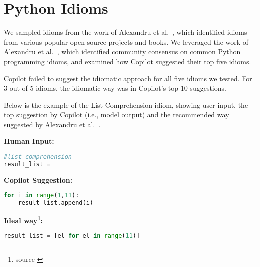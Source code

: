 \section{Python Idioms}
\label{secidioms}
We sampled idioms from the work of Alexandru et al.~\cite{Alexandru2018}, which identified idioms from various popular open source projects and books.
We leveraged the work of Alexandru et al.~\cite{Alexandru2018}, which identified community consensus on common Python programming idioms, and examined how Copilot suggested their top five idioms.

Copilot failed to suggest the idiomatic approach for all five idioms we tested. 
For 3 out of 5 idioms, the idiomatic way was in Copilot's top 10 suggestions.

Below is the example of the List Comprehension idiom, showing user input, the top suggestion by Copilot (i.e., model output) and the recommended way suggested by Alexandru et al.~\cite{Alexandru2018}.

\begin{tcolorbox}[title=List Comprehension,boxsep=.5mm]
\textbf{Human Input:}
\begin{lstlisting}[language={Python}]
#list comprehension
result_list = 
\end{lstlisting}
\tcbline
\textbf{Copilot Suggestion:}
\begin{lstlisting}[language=Python,escapechar=\%]
% \noindent\textcolor{gray}{result\_list  =} % []
for i in range(1,11):
    result_list.append(i)
\end{lstlisting}
\tcbline
\textbf{Ideal way\footnote{source \cite{Alexandru2018}}:}
\begin{lstlisting}[language=Python]
result_list = [el for el in range(11)]
\end{lstlisting}
\end{tcolorbox}
